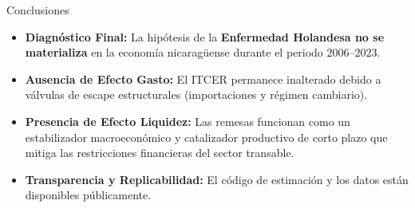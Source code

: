 \documentclass[
  10pt,
  ignorenonframetext,
  aspectratio=169,
  spanish,
]{beamer}
\providecommand{\tightlist}{%
  \setlength{\itemsep}{0pt}\setlength{\parskip}{0pt}}
\begin{document}
\begin{frame}{Conclusiones}
\protect{}\label{conclusiones}
\begin{itemize}
\tightlist
\item
  \textbf{Diagnóstico Final:} La hipótesis de la \textbf{Enfermedad
  Holandesa no se materializa} en la economía nicaragüense durante el
  periodo 2006--2023.
\item
  \textbf{Ausencia de Efecto Gasto:} El ITCER permanece inalterado
  debido a válvulas de escape estructurales (importaciones y régimen
  cambiario).
\item
  \textbf{Presencia de Efecto Liquidez:} Las remesas funcionan como un
  estabilizador macroeconómico y catalizador productivo de corto plazo
  que mitiga las restricciones financieras del sector transable.
\item
  \textbf{Transparencia y Replicabilidad:} El código de estimación y los
  datos están disponibles públicamente.
\end{itemize}
\end{frame}
\end{document}
